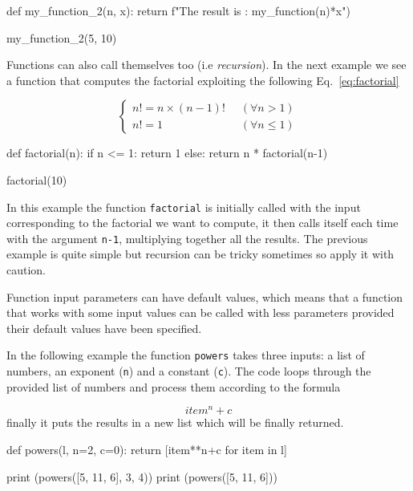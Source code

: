 \begin{ipython}
def my_function_2(n, x):
    return f"The result is : {my_function(n)*x}")

my_function_2(5, 10)
\end{ipython}

Functions can also call themselves too (i.e \emph{recursion}). In the next example we see a function that computes the factorial exploiting the following Eq.~\ref{eq:factorial}

\begin{equation}
\begin{cases}
    n! = n \times (n-1)! & \;\; (\forall n > 1) \\
    n! = 1 & \;\; (\forall n \le 1)
\end{cases}
\label{eq:factorial}
\end{equation}

\begin{ipython}
def factorial(n):
    if n <= 1:
        return 1
    else:
        return n * factorial(n-1)

factorial(10)
\end{ipython}

In this example the function \texttt{factorial} is initially called with the input corresponding to the factorial we want to compute, it then calls itself each time with the argument \texttt{n-1}, multiplying together all the results. The previous example is quite simple but recursion can be tricky sometimes so apply it with caution. 

Function input parameters can have default values, which means that a function that works with some input values can be called with less parameters provided their default values have been specified.

In the following example the function \texttt{powers} takes three inputs: a list of numbers, an exponent (\texttt{n}) and a constant (\texttt{c}). The code loops through the provided list of numbers and process them according to the formula 

\begin{equation*}
item^{n} + c
\end{equation*}
finally it puts the results in a new list which will be finally returned.

\begin{ipython}
def powers(l, n=2, c=0):
    return [item**n+c for item in l]

print (powers([5, 11, 6], 3, 4))
print (powers([5, 11, 6]))
\end{ipython}
\begin{ioutput}
[129, 1335, 220]
[25, 121, 36]
\end{ioutput}
    
